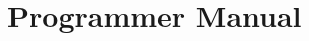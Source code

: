 \documentclass{dabcclass}
\begin{document}
\part{Programmer Manual}
 \cleardoublepage

\thispagestyle{empty}
 \cleardoublepage

\end{document}
